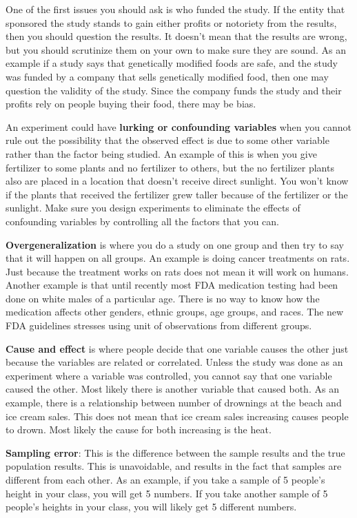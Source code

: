 \documentclass[]{book}
\begin{document}
One of the first issues you should ask is who funded the study. If the entity that sponsored the study stands to gain either profits or notoriety from the results, then you should question the results. It doesn't mean that the results are wrong, but you should scrutinize them on your own to make sure they are sound. As an example if a study says that genetically modified foods are safe, and the study was funded by a company that sells genetically modified food, then one may question the validity of the study. Since the company funds the study and their profits rely on people buying their food, there may be bias.

An experiment could have \textbf{lurking or confounding variables} when you cannot rule out the possibility that the observed effect is due to some other variable rather than the factor being studied. An example of this is when you give fertilizer to some plants and no fertilizer to others, but the no fertilizer plants also are placed in a location that doesn't receive direct sunlight. You won't know if the plants that received the fertilizer grew taller because of the fertilizer or the sunlight. Make sure you design experiments to eliminate the effects of confounding variables by controlling all the factors that you can.

\textbf{Overgeneralization} is where you do a study on one group and then try to say that it will happen on all groups. An example is doing cancer treatments on rats. Just because the treatment works on rats does not mean it will work on humans. Another example is that until recently most FDA medication testing had been done on white males of a particular age. There is no way to know how the medication affects other genders, ethnic groups, age groups, and races. The new FDA guidelines stresses using unit of observations from different groups.

\textbf{Cause and effect} is where people decide that one variable causes the other just because the variables are related or correlated. Unless the study was done as an experiment where a variable was controlled, you cannot say that one variable caused the other. Most likely there is another variable that caused both. As an example, there is a relationship between number of drownings at the beach and ice cream sales. This does not mean that ice cream sales increasing causes people to drown. Most likely the cause for both increasing is the heat.

\textbf{Sampling error}: This is the difference between the sample results and the true population results. This is unavoidable, and results in the fact that samples are different from each other. As an example, if you take a sample of 5 people's height in your class, you will get 5 numbers. If you take another sample of 5 people's heights in your class, you will likely get 5 different numbers.
\end{document}
